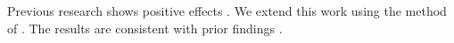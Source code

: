 Previous research shows positive effects \citep{smith2024, jones2023}. We extend this work using the method of \citet{brown2022}. The results are consistent with prior findings \citep{white2021}.
